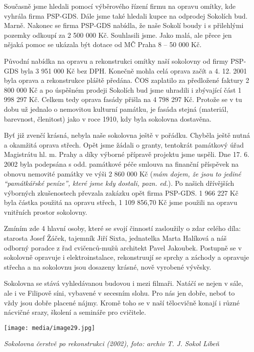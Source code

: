 Současně jsme hledali pomocí výběrového řízení firmu na opravu omítky,
kde vyhrála firma PSP-GDS. Dále jsme také hledali kupce na odprodej
Sokolích bud. Marně. Nakonec se firma PSP-GDS nabídla, že naše Sokolí
boudy i s přilehlými pozemky odkoupí za 2 500 000 Kč. Souhlasili jsme.
Jako malá, ale přece jen nějaká pomoc se ukázala být dotace od MČ Praha
8 -- 50 000 Kč.

Původní nabídka na opravu a rekonstrukci omítky naší sokolovny od firmy
PSP-GDS byla 3 951 000 Kč bez DPH. Konečně mohla celá oprava začít a 4.
12. 2001 byla oprava a rekonstrukce pláště předána. ČOS zaplatilo za
předložené faktury 2 800 000 Kč a po úspěšném prodeji Sokolích bud jsme
uhradili i zbývající část 1 998 297 Kč. Celkem tedy oprava fasády přišla
na 4 798 297 Kč. Protože se v tu dobu už jednalo o nemovitou kulturní
památku, je fasáda stejná (materiál, barevnost, členitost) jako v roce
1910, kdy byla sokolovna dostavěna.

Byť již zvenčí krásná, nebyla naše sokolovna ještě v pořádku. Chyběla
ještě nutná a okamžitá oprava střech. Opět jsme žádali o granty,
tentokrát památkový úřad Magistrátu hl. m. Prahy a díky výborné přípravě
projektu jsme uspěli. Dne 17. 6. 2002 byla podepsána s odd. památkové
péče smlouva na finanční příspěvek na obnovu nemovité památky ve výši 2
860 000 Kč (\emph{mám dojem, že jsou to jediné ``památkářské peníze'',
které jsme kdy dostali, pozn. ed.}). Po našich dřívějších výborných
zkušenostech převzala zakázku opět firma PSP-GDS. 1 966 227 Kč byla
částka použitá na opravu střech, 1 109 856,70 Kč jsme použili na opravu
vnitřních prostor sokolovny.

Zmíním zde 4 hlavní osoby, které se svojí činností zasloužily o zdar
celého díla: starosta Josef Žáček, tajemník Jiří Sixta, jednatelka Marta
Halíková a náš odborný poradce z řad cvičenců-mužů architekt Pavel
Jakoubek. Postupně se v sokolovně opravuje i elektroinstalace,
rekonstruují se sprchy a záchody a opravuje střecha a na sokolovnu jsou
dosazeny krásné, nově vyrobené vývěsky.

Sokolovna se stává vyhledávanou budovou i mezi filmaři. Natáčí se nejen
v sále, ale i ve Filipově síni, vybavené v secesním slohu. Pro nás jen
dobře, neboť to vždy jsou dobře placené nájmy. Kromě toho se v naší
tělocvičně konají i různé nácvičné srazy, školení a semináře pro
cvičitele.

\texttt{[image: media/image29.jpg]}

\emph{Sokolovna čerstvě po rekonstrukci (2002), foto: archiv T. J. Sokol
Libeň}

